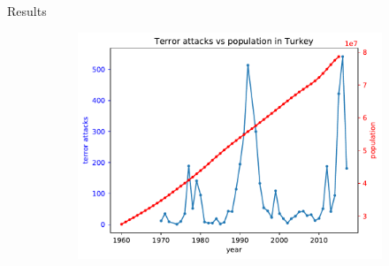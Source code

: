 \documentclass{beamer}
\begin{document}
\begin{frame}{Results}
\begin{figure}
\begin{subfigure}[b]{0.3\textwidth}
			\includegraphics[width=\textwidth]{Population-Terror/attackVsPopulationTurkey}
		\end{subfigure}
	\end{figure}
\end{frame}
\end{document}

